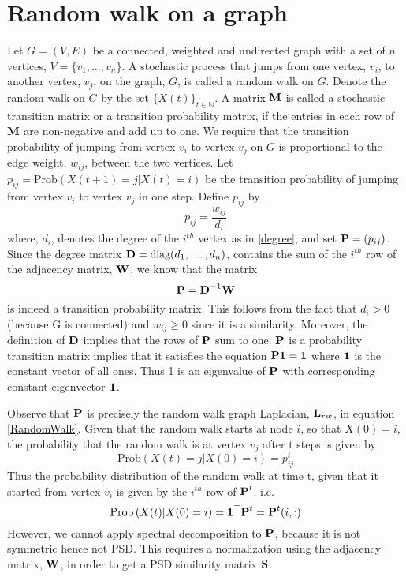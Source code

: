 \section{Random walk on a graph}\label{random walk}
Let $G=(V,E)$ be a connected, weighted and undirected graph with a set of $n$ vertices, $V = \{v_{1}, \dots, v_{n} \}$.
A stochastic process that jumps from one vertex, $v_{i}$, to another vertex, $v_{j}$, on the graph, $G$, is called a random walk on $G$.
Denote the random walk on $G$ by the set $\{X(t)\}_{t \in \mathbb{N}}$.
A matrix $\textbf{M}$ is called a stochastic transition matrix or a transition probability matrix, if the entries in each row of $\textbf{M}$ are non-negative and add up to one.
We require that the transition probability of jumping from vertex $v_{i}$
to vertex $v_{j}$ on $G$ is proportional to the edge weight, $w_{ij}$, between the two vertices. 
Let $p_{ij} = \text{Prob} \left(X(t+1) = j | X(t) = i \right)$ be the transition probability of jumping from vertex $v_{i}$ to vertex $v_{j}$ in one step. Define $p_{ij}$ by
\begin{equation}
p_{ij}   = \frac{w_{ij}}{d_{i}}
\end{equation}
where, $d_{i}$,  denotes the degree of the $i^{th}$ vertex as in \eqref{degree}, and 
set $\textbf{P} = (p_{ij})$. Since the degree matrix $\textbf{D} = \text{diag}(d_{1}, \ldots, d_{n})$, contains the sum of the $i^{th}$ row of the adjacency matrix, $\textbf{W}$,
we know that the matrix 
\begin{equation}\label{transitmatrix}
\textbf{P} = \textbf{D}^{-1}\textbf{W} 
\end{equation}
is indeed a transition probability matrix. This follows from the fact that $d_{i} > 0$ (because G is connected) and $w_{ij} \geq 0$ since it is a similarity. Moreover, the definition of $\textbf{D}$ implies that the rows of $\textbf{P}$ sum to one. 
$\textbf{P}$ is a probability transition matrix implies that it satisfies
the equation $\textbf{P} \boldsymbol{1} = \boldsymbol{1}$ where $\boldsymbol{1}$ is the constant vector of all ones. Thus 1 is an eigenvalue of $\textbf{P}$ with corresponding constant eigenvector $\boldsymbol{1}$.


Observe that $\textbf{P}$ is precisely the random walk graph Laplacian, $\textbf{L}_{rw}$, in equation \eqref{RandomWalk}.
Given that the random walk starts at node $i$, so that $X(0) = i$, the probability
that the random walk is at vertex $v_{j}$ after t steps is given by
\[
\text{Prob}\left( X(t) = j | X(0) = i  \right) = p_{ij}^{t}
\]
Thus the probability distribution of the random walk at time t, given that it started from vertex $v_{i}$ is given by the  $i^{th}$ row of $\textbf{P}^{t}$, i.e.
\begin{equation}\label{pdftime}
\text{Prob}\left( X(t) | X(0) = i  \right) = \boldsymbol{1}^{\top}\textbf{P}^{t} = \textbf{P}^{t}(i, :)
\end{equation}
However, we cannot apply spectral decomposition to $\textbf{P}$, because it is
not symmetric hence not PSD.
This requires a normalization using the adjacency matrix, $\textbf{W}$, in order
to get a PSD similarity matrix $\textbf{S}$.

